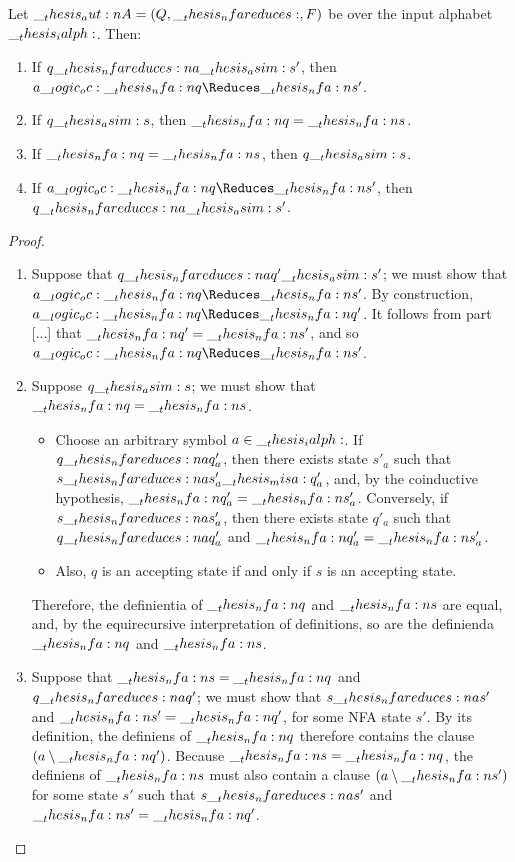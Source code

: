\begin{theorem}[Adequacy]
  Let $\aut{A} = (Q, \mathord{\nfareduces}, F)$ be  over the input alphabet $\__thesis_ialph:$.
  Then:
  \begin{enumerate}
  \item If $q \nfareduces[a]\asim s'$, then $a \oc \nfa{q} \Reduces \nfa{s}'$.
  \item If $q \__thesis_asim: s$, then $\__thesis_nfa:n {q} = \__thesis_nfa:n {s}$.
  \item If $\__thesis_nfa:n {q} = \__thesis_nfa:n {s}$, then $q \__thesis_asim: s$.
  \item If $a \oc \nfa{q} \Reduces \nfa{s}'$, then $q \nfareduces[a]\asim s'$.
  \end{enumerate}
\end{theorem}
%
\begin{proof}
  \begin{enumerate}
  \item Suppose that $q \nfareduces[a] q' \asim s'$; we must show that $a \oc \nfa{q} \Reduces \nfa{s}'$.
    By construction, $a \oc \nfa{q} \Reduces \nfa{q}'$.
    It follows from part [...] that $\__thesis_nfa:n {q}' = \__thesis_nfa:n {s}'$, and so $a \oc \nfa{q} \Reduces \nfa{s}'$.

  \item Suppose $q \__thesis_asim: s$; we must show that $\__thesis_nfa:n {q} = \__thesis_nfa:n {s}$.
    \begin{itemize}
    \item Choose an arbitrary symbol $a \in \__thesis_ialph:$.
      If $q \nfareduces[a] q'_a$, then there exists  state $s'_a$ such that $s \nfareduces[a] s'_a \misa q'_a$, and, by the coinductive hypothesis, $\__thesis_nfa:n {q}'_a = \__thesis_nfa:n {s}'_a$.
      Conversely, if $s \nfareduces[a] s'_a$, then there exists  state $q'_a$ such that $q \nfareduces[a] q'_a$ and $\__thesis_nfa:n {q}'_a = \__thesis_nfa:n {s}'_a$.
    \item Also, $q$ is an accepting state if and only if $s$ is an accepting state.
    \end{itemize}
    Therefore, the definientia of $\__thesis_nfa:n {q}$ and $\__thesis_nfa:n {s}$ are equal, and, by the equirecursive interpretation of definitions, so are the definienda $\__thesis_nfa:n {q}$ and $\__thesis_nfa:n {s}$.

  \item Suppose that $\__thesis_nfa:n {s} = \__thesis_nfa:n {q}$ and $q \nfareduces[a] q'$; we must show that $s \nfareduces[a] s'$ and $\__thesis_nfa:n {s}' = \__thesis_nfa:n {q}'$, for some \ac{NFA} state $s'$.
    By its definition, the definiens of $\__thesis_nfa:n {q}$ therefore contains the clause $(a \mathbin { \setminus } \__thesis_nfa:n {q}')$.
    Because $\__thesis_nfa:n {s} = \__thesis_nfa:n {q}$, the definiens of $\__thesis_nfa:n {s}$ must also contain a clause $(a \mathbin { \setminus } \__thesis_nfa:n {s}')$ for some state $s'$ such that $s \nfareduces[a] s'$ and $\__thesis_nfa:n {s}' = \__thesis_nfa:n {q}'$.


\end{enumerate}
\end{proof}
